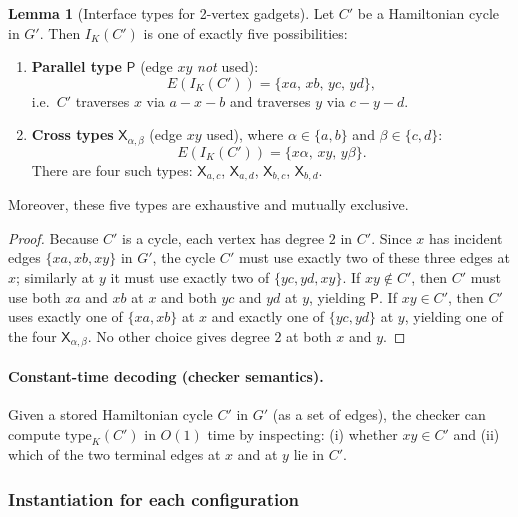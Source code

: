 \documentclass[12pt]{article}
\theoremstyle{definition}
\newtheorem{lemma}[theorem]{Lemma}
\newcommand{\CtwoGadgetVertices}{2}
\begin{document}
\begin{lemma}[Interface types for \CtwoGadgetVertices-vertex gadgets]
\label{lem:interfaces-2vertex}
Let $C'$ be a Hamiltonian cycle in $G'$.  Then $I_K(C')$ is one of exactly five
possibilities:
\begin{enumerate}
    \item \textbf{Parallel type} $\mathsf{P}$ (edge $xy$ \emph{not} used):
    \[
    E(I_K(C'))=\{xa,\,xb,\,yc,\,yd\},
    \]
    i.e.\ $C'$ traverses $x$ via $a\!-\!x\!-\!b$ and traverses $y$ via
    $c\!-\!y\!-\!d$.

    \item \textbf{Cross types} $\mathsf{X}_{\alpha,\beta}$ (edge $xy$ used), where
    $\alpha\in\{a,b\}$ and $\beta\in\{c,d\}$:
    \[
    E(I_K(C'))=\{x\alpha,\,xy,\,y\beta\}.
    \]
    There are four such types: $\mathsf{X}_{a,c}$, $\mathsf{X}_{a,d}$,
    $\mathsf{X}_{b,c}$, $\mathsf{X}_{b,d}$.
\end{enumerate}
Moreover, these five types are exhaustive and mutually exclusive.
\end{lemma}

\begin{proof}
Because $C'$ is a cycle, each vertex has degree $2$ in $C'$.
Since $x$ has incident edges $\{xa,xb,xy\}$ in $G'$, the cycle $C'$ must use
exactly two of these three edges at $x$; similarly at $y$ it must use exactly
two of $\{yc,yd,xy\}$.
If $xy\notin C'$, then $C'$ must use both $xa$ and $xb$ at $x$ and both $yc$ and
$yd$ at $y$, yielding $\mathsf{P}$.
If $xy\in C'$, then $C'$ uses exactly one of $\{xa,xb\}$ at $x$ and exactly one
of $\{yc,yd\}$ at $y$, yielding one of the four $\mathsf{X}_{\alpha,\beta}$.
No other choice gives degree $2$ at both $x$ and $y$.
\end{proof}

\paragraph{Constant-time decoding (checker semantics).}
Given a stored Hamiltonian cycle $C'$ in $G'$ (as a set of edges),
the checker can compute $\mathrm{type}_K(C')$ in $O(1)$ time by inspecting:
(i) whether $xy\in C'$ and (ii) which of the two terminal edges at $x$ and at $y$
lie in $C'$.

\medskip

\subsubsection{Instantiation for each configuration}
\label{subsubsec:interface-instantiations}
\end{document}
